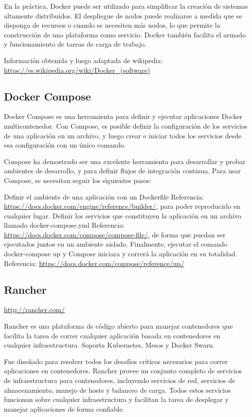 En la práctica, Docker puede ser utilizado para simplificar la creación de
sistemas altamente distribuidos. El despliegue de nodos puede realizarse a
medida que se disponga de recursos o cuando se necesiten más nodos, lo que
permite la construcción de una plataforma como servicio. Docker también
facilita el armado y funcionamiento de tareas de carga de trabajo.

Información obtenida y luego adaptada de wikipedia:
\url{https://es.wikipedia.org/wiki/Docker_(software)}


\subsection{Docker Compose}

Docker Compose es una herramienta para definir y ejecutar aplicaciones Docker
multicontenedor. Con Compose, es posible definir la configuración de los
servicios de una aplicación en un archivo, y luego crear e iniciar todos los
servicios desde esa configuración con un único comando.

Compose ha demostrado ser una excelente herramienta para desarrollar y probar
ambientes de desarrollo, y para definir flujos de integración continua. Para
usar Compose, se necesitan seguir los siguientes pasos:

Definir el ambiente de una aplicación con un Dockerfile Referencia:
\url{https://docs.docker.com/engine/reference/builder/}, para poder reproducirlo en
cualquier lugar.
Definir los servicios que constituyen la aplicación en un archivo llamado docker-compose.yml Referencia: \url{https://docs.docker.com/compose/compose-file/}, de forma que puedan ser ejecutados juntos en un ambiente aislado.
Finalmente, ejecutar el comando docker-compose up y Compose iniciara y correrá la aplicación en su totalidad. Referencia: \url{https://docs.docker.com/compose/reference/up/}


\subsection{Rancher}
\url{http://rancher.com/}

Rancher es una plataforma de código abierto para manejar contenedores que
facilita la tarea de correr cualquier aplicación basada en contenedores en
cualquier infraestructura. Soporta Kubernetes, Mesos y Docker Swarn.

Fue diseñado para resolver todos los desafíos críticos necesarios para correr
aplicaciones en contenedores. Rancher provee un conjunto completo de servicios
de infraestructura para contenedores, incluyendo servicios de red, servicios de
almacenamiento, manejo de hosts y balanceo de carga. Todos estos servicios
funcionan sobre cualquier infraestructura y facilitan la tarea de desplegar y
manejar aplicaciones de forma confiable.

